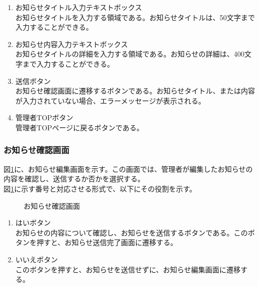 \documentclass[a4j]{jarticle}
\begin{document}
\begin{enumerate}
  \renewcommand{\labelenumi}{\textcircled{\scriptsize \theenumi}}
  \item お知らせタイトル入力テキストボックス\\
  お知らせタイトルを入力する領域である。お知らせタイトルは、50文字まで入力することができる。
  \item お知らせ内容入力テキストボックス\\
  お知らせタイトルの詳細を入力する領域である。お知らせの詳細は、400文字まで入力することができる。
  \item 送信ボタン\\
  お知らせ確認画面に遷移するボタンである。お知らせタイトル、または内容が入力されていない場合、エラーメッセージが表示される。
  \item 管理者TOPボタン\\
  管理者TOPページに戻るボタンである。
\end{enumerate}

\subsubsection{お知らせ確認画面}
図\ref{fig:news_edit_confirm}に、お知らせ編集画面を示す。この画面では、管理者が編集したお知らせの内容を確認し、送信するか否かを選択する。\\
図\ref{fig:news_edit_confirm}に示す番号と対応させる形式で、以下にその役割を示す。
\begin{figure}[H]
\centering
{}
\caption{お知らせ確認画面}
\label{fig:news_edit_confirm}
\end{figure}
\begin{enumerate}
  \renewcommand{\labelenumi}{\textcircled{\scriptsize \theenumi}}
  \item はいボタン\\
  お知らせの内容について確認し、お知らせを送信するボタンである。このボタンを押すと、お知らせ送信完了画面に遷移する。
  \item いいえボタン\\
  このボタンを押すと、お知らせを送信せずに、お知らせ編集画面に遷移する。
\end{enumerate}
\end{document}
